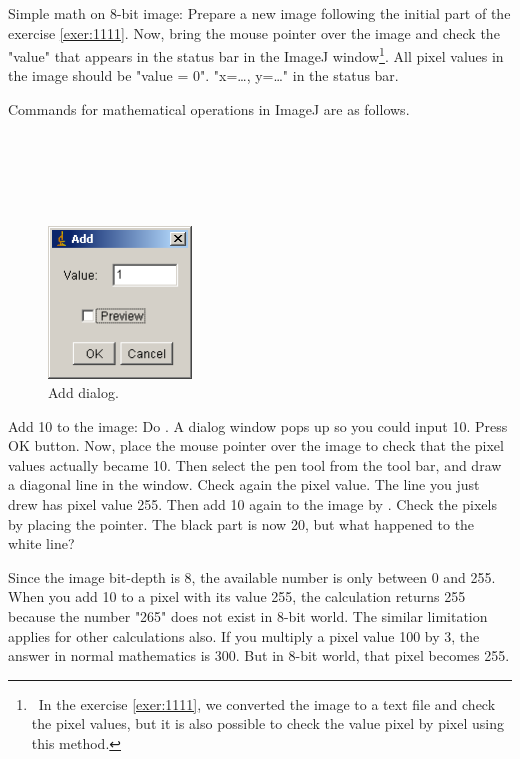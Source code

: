 \begin{indentexercise}{1}
Simple math on 8-bit image: Prepare a new
image following the initial part of the exercise \ref{exer:1111}. Now,
bring the mouse pointer over the image and check the
"value" that appears in the
status bar in the ImageJ window\footnote{\ In the exercise \ref{exer:1111}, 
we converted the image to a text file and check the pixel
values, but it is also possible to check the value pixel by pixel using
this method.}. All pixel values in the image should be
"value = 0".
"x=\ldots, y=\ldots " in the
status bar. 

Commands for mathematical operations in ImageJ are as follows. 

\\
\\ 
 \\
\\

\begin{figure}[htbp]
\begin{center}
\includegraphics[width=3.8cm]{img/CMCIBasicCourse201102-img12.png}
\caption{ Add dialog.}
\label{fig:img12}
\end{center}
\end{figure}


Add 10 to the image: Do . A dialog window pops up so you could
input 10. Press OK button. Now, place the mouse pointer over the image
to check that the pixel values actually became 10. Then select the pen
tool from the tool bar, and draw a diagonal line in the window. Check
again the pixel value. The line you just drew has pixel value 255. Then
add 10 again to the image by . Check the pixels by placing the pointer.
The black part is now 20, but what happened to the white line? 

Since the image bit-depth is 8, the available number is only between 0
and 255. When you add 10 to a pixel with its value 255, the calculation
returns 255 because the number
"265" does not exist in 8-bit
world. The similar limitation applies for other calculations also. If
you multiply a pixel value 100 by 3, the answer in normal mathematics
is 300. But in 8-bit world, that pixel becomes 255. 


\end{indentexercise}
